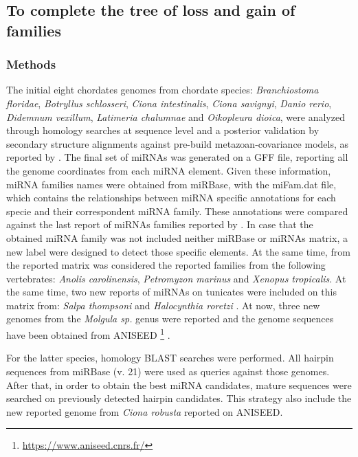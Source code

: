 \documentclass[11pt]{article}
\begin{document}
\subsection*{To complete the tree of loss and gain of families}
\subsubsection*{Methods}

The initial eight chordates genomes from chordate species: 
\textit{Branchiostoma floridae}, \textit{Botryllus schlosseri}, 
\textit{Ciona intestinalis}, \textit{Ciona savignyi}, \textit{Danio rerio}, 
\textit{Didemnum vexillum}, \textit{Latimeria chalumnae} and 
\textit{Oikopleura dioica}, were analyzed through homology searches at sequence 
level and a posterior validation by secondary structure alignments against 
pre-build metazoan-covariance models, as reported by \cite{velandia:2016}. The 
final set of miRNAs was generated on a GFF file, reporting all the genome 
coordinates from each miRNA element. Given these information, miRNA families 
names were obtained from miRBase, with the miFam.dat file, which contains the 
relationships between miRNA specific annotations for each specie and their 
correspondent miRNA family. These annotations were compared against the last 
report of miRNAs families reported by \cite{Hertel2015}. In case that the 
obtained miRNA family was not included neither miRBase or miRNAs matrix, a new 
label were designed to detect those specific elements. At the same time, from 
the reported matrix was considered the reported families from the following 
vertebrates: \textit{Anolis carolinensis}, \textit{Petromyzon marinus} and 
\textit{Xenopus tropicalis}. At the same time, two new reports of miRNAs on 
tunicates were included on this matrix from: \textit{Salpa thompsoni} 
\cite{Jue2016} and \textit{Halocynthia roretzi} \cite{Wang2017}. At now, three 
new genomes from the \textit{Molgula sp.} genus were reported \cite{Stolfi2014} 
and the genome sequences have been obtained from ANISEED 
\footnote{\url{https://www.aniseed.cnrs.fr/}} \cite{Brozovic2017}.

For the latter species, homology BLAST searches were performed. All hairpin 
sequences from miRBase (v. 21) \cite{Kozomara2014} were used as queries against 
those genomes. After that, in order to obtain the best miRNA 
candidates, mature sequences were searched on previously detected hairpin 
candidates. This strategy also include the new reported genome from 
\textit{Ciona robusta} reported on ANISEED. 
\end{document}
